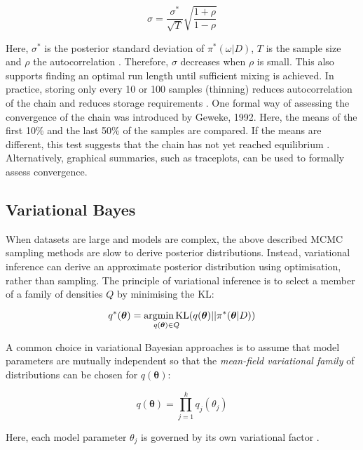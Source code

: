 \begin{equation}
\sigma=\frac{\sigma^*}{\sqrt{T}}\sqrt{\frac{1+\rho}{1-\rho}}
\end{equation}

Here, $\sigma^*$ is the posterior standard deviation of $\pi^*(\omega|D)$, $T$ is the sample size and $\rho$ the autocorrelation \citep{Tierney1991}. 
Therefore, $\sigma$ decreases when $\rho$ is small. 
This also supports finding an optimal run length until sufficient mixing is achieved. 
In practice, storing only every 10 or 100 samples (thinning) reduces autocorrelation of the chain and reduces storage requirements \citep{Greyer1992}. 
One formal way of assessing the convergence of the chain was introduced by Geweke, 1992. 
Here, the means of the first 10\% and the last 50\% of the samples are compared. 
If the means are different, this test suggests that the chain has not yet reached equilibrium \citep{Geweke1992}. 
Alternatively, graphical summaries, such as traceplots, can be used to formally assess convergence.

\subsection{Variational Bayes}

When datasets are large and models are complex, the above described MCMC sampling methods are slow to derive posterior distributions. 
Instead, variational inference can derive an approximate posterior distribution using optimisation, rather than sampling. 
The principle of variational inference is to select a member of a family of densities $Q$ by minimising the \gls{KL}:

\begin{equation}
q^\ast(\bm{\theta})=\underset{q(\bm{\theta})\in{}Q}{\textnormal{argmin\,{}KL}}(q(\bm{\theta})||\pi^*(\bm{\theta}|D))
\end{equation}

A common choice in variational Bayesian approaches is to assume that model parameters are mutually independent so that the \emph{mean-field variational family} of distributions can be chosen for $q(\bm{\theta})$:

\begin{equation}
q(\bm{\theta})=\prod_{j=1}^k{}q_j(\theta_j)
\end{equation}

Here, each model parameter $\theta_j$ is governed by its own variational factor \citep{Blei2017}.\\

